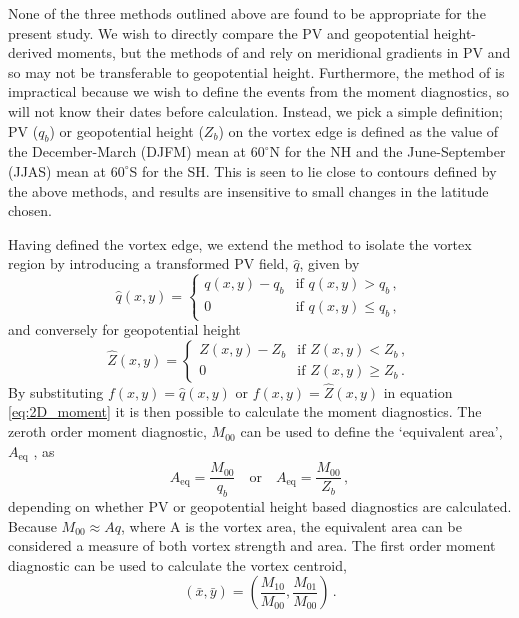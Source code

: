 None of the three methods outlined above are found to be appropriate for the
present study. We wish to directly compare the PV and geopotential
height-derived moments, but the methods of \citet{Waugh1999} and
\citet{Nash1996} rely on meridional gradients in PV and so may not be
transferable to geopotential height. Furthermore, the method of
\citet{Matthewman2009} is impractical because we wish to define the events from
the moment diagnostics, so will not know their dates before
calculation. Instead, we pick a simple definition; PV ($q_{b}$) or geopotential
height ($Z_{b}$) on the vortex edge is defined as the value of the
December-March (DJFM) mean at $60^{\circ}$N for the NH and the
June-September (JJAS) mean at $60^{\circ}$S for the SH. This is
seen to lie close to contours defined by the above methods, and results are
insensitive to small changes in the latitude chosen.

Having defined the vortex edge, we extend the method \citet{Matthewman2009} to
isolate the vortex region by introducing a transformed PV field, $\hat{q}$,
given by
\begin{equation}
 \hat{q}(x,y) = 
 \begin{cases}
   q(x,y) - q_{b} & \text{if $q(x,y) > q_{b}$} \, , \\
   0 & \text{if $q(x,y) \leq q_{b}$} \, , 
 \end{cases}
\end{equation}
and conversely for geopotential height 
\begin{equation}
 \hat{Z}(x,y) = 
 \begin{cases}
   Z(x,y) - Z_{b} & \text{if $Z(x,y) < Z_{b}$} \, , \\
   0 & \text{if $Z(x,y) \geq Z_{b}$} \, . 
 \end{cases}
\end{equation}
By substituting $f(x,y) = \hat{q}(x,y)$ or $f(x,y) = \hat{Z}(x,y)$ in equation
\ref{eq:2D_moment} it is then possible to calculate the moment diagnostics. The
zeroth order moment diagnostic, $M_{00}$ can be used to define the `equivalent
area', $A_{\mathrm{eq}}$ \citep{Matthewman2009}, as
\begin{equation} 
A_{\mathrm{eq}} = \frac{M_{00}}{q_{b}}\quad \text{or} \quad A_{\mathrm{eq}} = \frac{M_{00}}{Z_b}\, ,
\end{equation}
depending on whether PV or geopotential height based diagnostics are
calculated. Because $M_{00} \approx Aq$, where A is the vortex area, the
equivalent area can be considered a measure of both vortex strength and
area. The first order moment diagnostic can be used to calculate the vortex
centroid,
\begin{equation}
(\bar{x}, \bar{y}) = \left( \frac{M_{10}}{M_{00}}, \frac{M_{01}}{M_{00}} \right)
\, . 
\end{equation}

